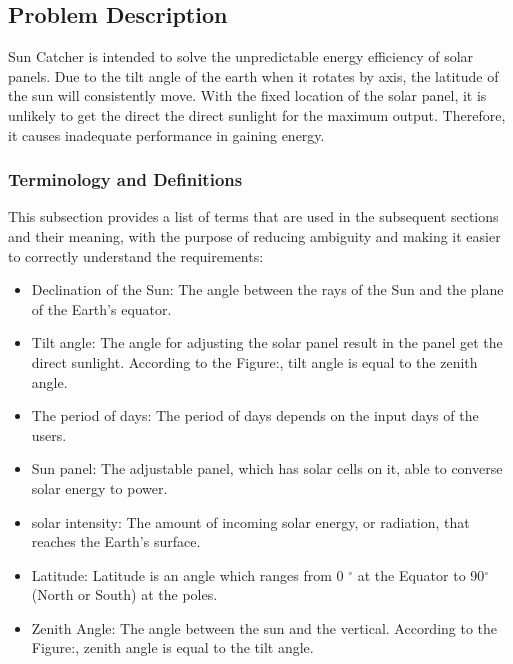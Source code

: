 \documentclass[12pt]{article}
\begin{document}
\subsection{Problem Description} \label{Sec_pd}

Sun Catcher is intended to solve the unpredictable energy efficiency of solar panels.
Due to the tilt angle of the earth when it rotates by axis, the latitude of the sun will 
consistently move. With the fixed location of the solar panel, it is unlikely to get the direct
the direct sunlight for the maximum output. Therefore, it causes inadequate performance in gaining energy.

\subsubsection{Terminology and  Definitions}

This subsection provides a list of terms that are used in the subsequent
sections and their meaning, with the purpose of reducing ambiguity and making it
easier to correctly understand the requirements:

\begin{itemize}

\item Declination of the Sun: The angle between the rays of the Sun and the plane of the Earth's equator.

\item Tilt angle: The angle for adjusting the solar panel result in the panel get the direct sunlight. According to the Figure:, tilt angle is equal to the zenith angle.

\item The period of days: The period of days depends on the input days of the users.

\item Sun panel: The adjustable panel, which has solar cells on it, able to converse solar energy
to power.

\item solar intensity: The amount of incoming solar energy, or radiation, that reaches the Earth's surface.

\item Latitude: Latitude is an angle which ranges from 0 $^\circ$ at the Equator to 90$^\circ$ (North or South) at the poles. 

\item Zenith Angle: The angle between the sun and the vertical. According to the Figure:, zenith angle is equal to the tilt angle.

\end{itemize}
\end{document}
